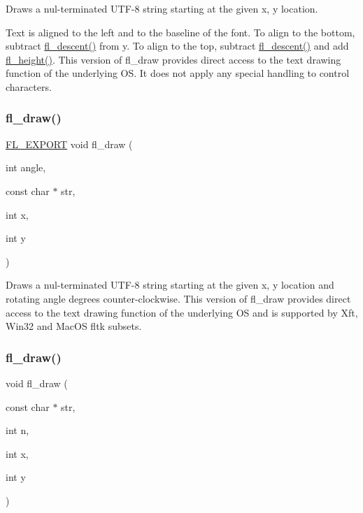 Draws a nul-\/terminated U\+T\+F-\/8 string starting at the given {\ttfamily x}, {\ttfamily y} location.

Text is aligned to the left and to the baseline of the font. To align to the bottom, subtract \hyperlink{group__fl__attributes_ga080e029f6b6fe5e6bf527bbfd890317d}{fl\+\_\+descent()} from {\ttfamily y}. To align to the top, subtract \hyperlink{group__fl__attributes_ga080e029f6b6fe5e6bf527bbfd890317d}{fl\+\_\+descent()} and add \hyperlink{group__fl__attributes_gac4acb828270adf35bf1d8fc06051f938}{fl\+\_\+height()}. This version of fl\+\_\+draw provides direct access to the text drawing function of the underlying OS. It does not apply any special handling to control characters. \mbox{\label{group__fl__drawings_gacf5b5ca37f2f40d7229413d9fc52c875}} 
\subsubsection{\texorpdfstring{fl\+\_\+draw()}{fl\_draw()}\hspace{0.1cm}{\footnotesize\ttfamily [2/6]}}
{\footnotesize\ttfamily \hyperlink{_fl___export_8_h_aa9ba29a18aee9d738370a06eeb4470fc}{F\+L\+\_\+\+E\+X\+P\+O\+RT} void fl\+\_\+draw (\begin{DoxyParamCaption}\item[{int}]{angle,  }\item[{const char $\ast$}]{str,  }\item[{int}]{x,  }\item[{int}]{y }\end{DoxyParamCaption})}

Draws a nul-\/terminated U\+T\+F-\/8 string starting at the given {\ttfamily x}, {\ttfamily y} location and rotating {\ttfamily angle} degrees counter-\/clockwise. This version of fl\+\_\+draw provides direct access to the text drawing function of the underlying OS and is supported by Xft, Win32 and Mac\+OS fltk subsets. \mbox{\label{group__fl__drawings_gae4ac5a0bc231f239e45dc1552b5ee738}} 
\subsubsection{\texorpdfstring{fl\+\_\+draw()}{fl\_draw()}\hspace{0.1cm}{\footnotesize\ttfamily [3/6]}}
{\footnotesize\ttfamily void fl\+\_\+draw (\begin{DoxyParamCaption}\item[{const char $\ast$}]{str,  }\item[{int}]{n,  }\item[{int}]{x,  }\item[{int}]{y }\end{DoxyParamCaption})\hspace{0.3cm}{\ttfamily [inline]}}

